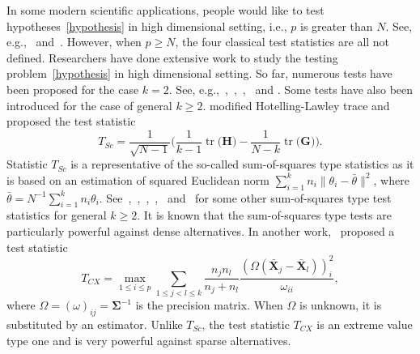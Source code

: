 \documentclass[12pt]{article} %
\DeclareMathOperator{\mytr}{tr}
\newcommand{\bX}{\mathbf{X}}
\newcommand{\bH}{\mathbf{H}}
\newcommand{\bG}{\mathbf{G}}
\newcommand{\bfsym}[1]{\ensuremath{\boldsymbol{#1}}}
\def\bSigma {\bfsym {\Sigma}}
\theoremstyle{definition}
\begin{document}
In some modern scientific applications, people would like to test hypotheses~\eqref{hypothesis} in high dimensional setting, i.e., $p$ is greater than $N$.
See, e.g.,~\citet{Verstynen1209} and~\citet{Tsai2009}.
However, when $p\geq N$, the four classical test statistics are all not defined.
  Researchers have done extensive work to study the testing problem~\eqref{hypothesis} in high dimensional setting.
 So far, numerous tests have been proposed for the case $k=2$.
 See, e.g.,~\citet{Bai1996Efiect},~\cite{Srivastava2007Multivariate},~\citet{Chen2010A},~\citet{Tony2013} and \citet{Feng2014Two}.
  Some tests have also been introduced for the case of general $k\geq 2$.
 \cite{Schott2007Some} modified Hotelling-Lawley trace and proposed the test statistic
  $$
  T_{Sc}=\frac{1}{\sqrt{N-1}}\Big(
  \frac{1}{k-1}\mytr\big(\bH\big)-\frac{1}{N-k}\mytr\big(\bG\big)
  \Big).
  $$
Statistic $T_{Sc}$ is a representative of the so-called sum-of-squares type statistics as it is based on an estimation of squared Euclidean norm $\sum_{i=1}^k n_i\|\theta_i-\bar{\theta}\|^2$, where $\bar{\theta}=N^{-1}\sum_{i=1}^k n_i \theta_i$.
See~\cite{Srivastava2013},~\cite{Hu2017},~\cite{Yamada2015},~\cite{ZHANG2017200},~\cite{Chang2017} and~\cite{2017arXiv171007878C} for some other sum-of-squares type test statistics for general $k\geq 2$.
It is known that the sum-of-squares type tests are particularly powerful against dense alternatives.
In another work,~\cite{Cai2014High} proposed a test statistic 
  $$
  T_{CX}=\max_{1\leq i\leq p} \sum_{1\leq j<l\leq k}\frac{n_j n_l}{n_j+n_l}\frac{(\Omega(\bar{\bX}_j-\bar{\bX}_l))_i^2}{\omega_{ii}},
  $$
  where $\Omega=(\omega)_{ij}=\bSigma^{-1}$ is the precision matrix. When $\Omega$ is unknown, it is substituted by an estimator.
  Unlike $T_{Sc}$, the test statistic $T_{CX}$ is an extreme value type one and is very powerful against sparse alternatives.
  
\end{document}
